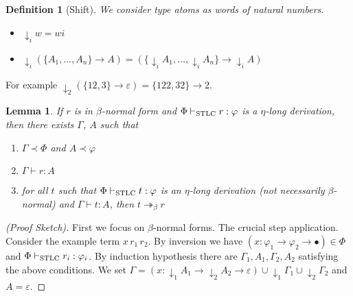 \documentclass[10pt,a4paper]{article}
\theoremstyle{plain}%
\newtheorem{definition}[theorem]{Definition}
\newtheorem{lemma}[theorem]{Lemma}
\begin{document}
\begin{definition}[Shift]
We consider type atoms as words of natural numbers.
\begin{itemize}
\item ${\downarrow_i}w = wi$
\item ${\downarrow_i}(\{A_1, \ldots, A_n\} \to A) = (\{{\downarrow_i}A_1, \ldots, {\downarrow_i}A_n\} \to {\downarrow_i}A)$
\end{itemize}
\end{definition}

For example ${\downarrow_2}(\{12, 3\} \to \varepsilon) = \{122, 32\} \to 2$.

\begin{lemma}
If $r$ is in $\beta$-normal form and $\Phi \vdash_{\textnormal{STLC}} r : \varphi$ is a $\eta$-long derivation, then there exists $\Gamma$, $A$ such that
\begin{enumerate}
\item $\Gamma \prec \Phi$ and $A \prec \varphi$
\item $\Gamma \vdash r : A$
\item for all $t$ such that $\Phi \vdash_{\textnormal{STLC}} t : \varphi$ is an $\eta$-long derivation (not necessarily $\beta$-normal) and $\Gamma \vdash t : A$, then $t \twoheadrightarrow_\beta r$
\end{enumerate}
\end{lemma}

\begin{proof}[(Proof Sketch)]
First we focus on $\beta$-normal forms.
The crucial step application.
Consider the example term $x\,r_1\,r_2$. By inversion we have $(x : \varphi_1 \to \varphi_2 \to \bullet) \in \Phi$ and $\Phi \vdash_{\textnormal{STLC}} r_i : \varphi_i$.
By induction hypothesis there are $\Gamma_1, A_1, \Gamma_2, A_2$ satisfying the above conditions.
We set $\Gamma = (x : {\downarrow_1} A_1 \to {\downarrow_2} A_2 \to \varepsilon) \cup {\downarrow_1}\Gamma_1 \cup {\downarrow_2}\Gamma_2$
and $A = \varepsilon$.
\end{proof}

\newpage
\end{document}
